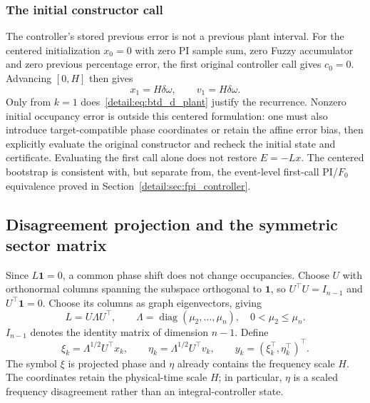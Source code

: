 \subsubsection{The initial constructor call}
The controller's stored previous error is not a previous plant interval.
For the centered initialization $x_0=0$ with zero PI sample sum, zero
Fuzzy accumulator and zero previous percentage error, the first original
controller call gives $c_0=0$. Advancing $[0,H]$ then gives
\begin{equation}
 x_1=H\delta\omega,\qquad v_1=H\delta\omega.
 \label{detail:eq:btd_bootstrap}
\end{equation}
Only from $k=1$ does~\eqref{detail:eq:btd_d_plant} justify the recurrence.
Nonzero initial occupancy error is outside this centered formulation:
one must also introduce target-compatible phase coordinates or retain the
affine error bias, then explicitly evaluate the original constructor and
recheck the initial state and certificate. Evaluating the first call alone
does not restore $E=-Lx$. The centered bootstrap is consistent with, but separate from, the
event-level first-call PI/$F_0$ equivalence proved in Section~\ref{detail:sec:fpi_controller}.

\subsection{Disagreement projection and the symmetric sector matrix}

Since $L\mathbf1=0$, a common phase shift does not change occupancies.
Choose $U$ with orthonormal columns spanning the subspace orthogonal to
$\mathbf1$, so $U^\top U=I_{n-1}$ and $U^\top\mathbf1=0$. Choose its
columns as graph eigenvectors, giving
\begin{equation}
 L=U\Lambda U^\top,\qquad
 \Lambda=\operatorname{diag}(\mu_2,\ldots,\mu_n),\quad 0<\mu_2\le\mu_n.
 \label{detail:eq:btd_d_spectrum}
\end{equation}
$I_{n-1}$ denotes the identity matrix of dimension $n-1$. Define
\begin{equation}
 \xi_k=\Lambda^{1/2}U^\top x_k,\qquad
 \eta_k=\Lambda^{1/2}U^\top v_k,\qquad y_k=(\xi_k^\top,\eta_k^\top)^\top.
 \label{detail:eq:btd_projection}
\end{equation}
The symbol $\xi$ is projected phase and $\eta$ already contains the
frequency scale $H$. The coordinates retain the physical-time scale $H$; in particular,
$\eta$ is a scaled frequency disagreement rather than an integral-controller state.


